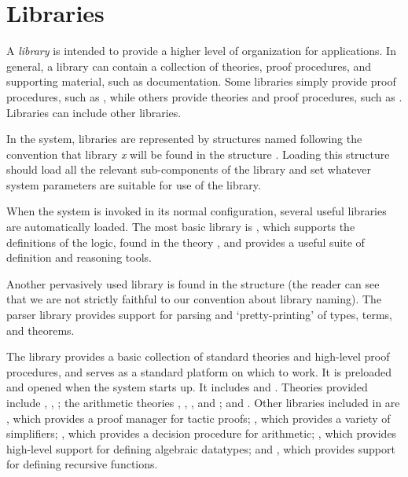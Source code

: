 \chapter{Libraries}\label{HOLlibraries}

%


\newcommand{\simpset}{simpset}
\newcommand{\Simpset}{Simpset}

{
 \newcommand{\term}      {\mbox{\it term}}
 \newcommand{\vstr}      {\mbox{\it vstr}}

A \emph{library} is intended to provide a higher level of
organization for \HOL{} applications. In general, a library
can contain a collection of theories, proof procedures,
and supporting material, such as documentation. Some libraries
simply provide proof procedures, such as ,
while others provide theories and proof procedures, such as
. Libraries can include other libraries.

In the \HOL{} system, libraries are represented by \ML{} structures
named following the convention that library \emph{x} will be found in
the \ML{} structure . Loading this structure should load all
the relevant sub-components of the library and set whatever system
parameters are suitable for use of the library.

When the \HOL{} system is invoked in its normal configuration, several
useful libraries are automatically loaded. The most basic \HOL{}
library is , which supports the definitions of
the \HOL{} logic, found in the theory , and provides a
useful suite of definition and reasoning tools.

Another pervasively used library is found in the structure 
(the reader can see that we are not strictly faithful to our
convention about library naming). The parser library provides support
for parsing and `pretty-printing' of \HOL{} types, terms, and
theorems.

The  library provides a basic collection of standard
theories and high-level proof procedures, and serves as a standard
platform on which to work. It is preloaded and opened when the \HOL{}
system starts up. It includes  and
. Theories provided include ,
, ; the arithmetic theories
, , ,
and ; and . Other libraries
included in  are , which provides
a proof manager for tactic proofs; , which provides
a variety of simplifiers; , which provides a decision
procedure for arithmetic; , which provides
high-level support for defining algebraic datatypes; and ,
which provides support for defining recursive functions.


}
